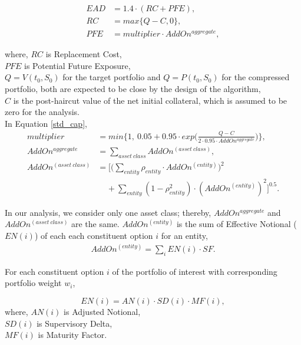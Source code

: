 \begin{align} 
EAD &= 1.4 \cdot (RC + PFE), \\
RC &= max\{Q-C, 0\}, \\
PFE &= multiplier \cdot AddOn^{aggregate}, \label{std_cap}
\end{align}

\noindent where, $RC$ is Replacement Cost, \\ 
$PFE$ is Potential Future Exposure, \\
$Q=V(t_0, S_0)$ for the target portfolio and $Q=P(t_0, S_0)$ for the compressed portfolio, both are expected to be close by the design of the algorithm, \\
$C$ is the post-haircut value of the net initial collateral, which is assumed to be zero for the analysis. \\

\noindent In Equation \ref{std_cap}, 
\begin{align}
multiplier &= min\{1, \ 0.05 + 0.95 \cdot exp\Big(  \frac{Q-C}{2 \cdot 0.95 \cdot AddOn^{aggregate}} \Big)\}, \\
AddOn^{aggregate} &= \sum_{asset \ class} AddOn^{(asset \ class)}, \\
AddOn^{(asset \ class)} &= \Big[ \big( \sum_{entity} \rho_{entity} \cdot AddOn^{(entity)} \big)^{2}  \nonumber \\ 
& \ \ \ \ \ + \sum_{entity} (1 - \rho^{2}_{entity} ) \cdot ( AddOn^{(entity)} )^{2} \Big]^{0.5}.
\end{align}

\noindent In our analysis, we consider only one asset class; thereby, $AddOn^{aggregate}$ and  $AddOn^{(asset \ class)}$ are the same.  $AddOn^{(entity)}$ is the sum of Effective Notional ($EN(i)$) of each each constituent option $i$ for an entity, 
\begin{align}
AddOn^{(entity)} = \sum_{i} EN(i) \cdot SF.
\end{align}

\noindent For each constituent option $i$ of the portfolio of interest with corresponding portfolio weight $w_i$, 

\begin{equation} \label{EN}
EN(i) = AN(i) \cdot SD(i) \cdot MF(i),
\end{equation}
where, $AN(i)$ is Adjusted Notional, \\ 
$SD(i)$ is Supervisory Delta,\\ 
$MF(i)$ is Maturity Factor. \\

